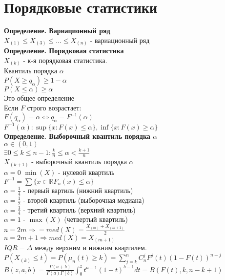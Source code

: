 \documentclass{article}
\newcommand\0{\mathbb{0}}
\newcommand\1{\mathbb{1}}
\begin{document}
\section{Порядковые статистики}
\textbf{Определение. Вариационный ряд}\\
$X_{(1)} \leq X_{(3)} \leq \dots \leq X_{(n)}$ - вариационный ряд\\
\textbf{Определение. Порядковая статистика}\\
$X_{(k)}$ - к-я порядковая статистика.\\
Квантиль порядка $\alpha$\\
$P(X \geq q_\alpha) \geq 1 - \alpha$\\
$P(X \leq \alpha) \geq \alpha$\\
Это общее определение\\
Если $F$ строго возрастает:\\
$F(q_\alpha) = \alpha \Leftrightarrow q_\alpha = F^{-1}(\alpha)$\\
$F^{-1}(\alpha): \sup\{x : F(x) \leq \alpha\}, \inf\{x : F(x) \geq \alpha\}$\\
\textbf{Определение. Выборочный квантиль порядка $\alpha$}\\
$\alpha \in (0,1)$\\
$\exists 0 \leq k \leq n - 1: \frac{k}{n} \leq \alpha < \frac{k + 1}{n}$\\
$X_{(k + 1)}$ - выборочный квантиль порядка $\alpha$\\
$\alpha = 0$ $\min(X)$ - нулевой квартиль\\
$F^{-1} = \sum\{x \in \mathbb{R} F_n(x) \leq \alpha\}$\\
$\alpha = \frac{1}{4}$ - первый вартиль (нижний квартиль)\\
$\alpha = \frac{1}{2}$ - второй квартиль (выборочная медиана)\\
$\alpha = \frac{3}{4}$ - третий квартиль (верхний квартиль)\\
$\alpha = 1$ - $\max(X)$ (четвертый квартиль)\\
$n = 2m \Rightarrow = med(X) = \frac{X_(m) + X_(m + 1)}{2}$\\
$n = 2m + 1 \Rightarrow med(X) = X_(m + 1)$\\
$IQR = \Delta$ между верхним и нижним квартилем.\\
$P(X_{(k)} \leq t) = P(\mu_n(t) \geq k) = \displaystyle\sum_{j = k}^n C_n^j F^j(t)(1 - F(t))^{n - j}$\\
$B(z,a,b) = \frac{\Gamma(a + b)}{\Gamma(a)\Gamma(b)} \displaystyle\int_0^z t^{a - 1}(1 - t)^{b - 1}dt = B(F(t),k,n - k + 1)$\\
\end{document}
